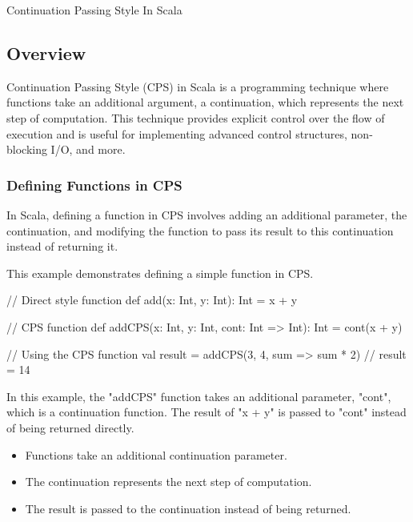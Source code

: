 \begin{notes}{Continuation Passing Style In Scala}
    \subsection*{Overview}

    Continuation Passing Style (CPS) in Scala is a programming technique where functions take an additional argument, a continuation, which represents the next step of computation. This technique 
    provides explicit control over the flow of execution and is useful for implementing advanced control structures, non-blocking I/O, and more.
    
    \subsubsection*{Defining Functions in CPS}
    
    In Scala, defining a function in CPS involves adding an additional parameter, the continuation, and modifying the function to pass its result to this continuation instead of returning it.
    
    \begin{highlight}
    
        This example demonstrates defining a simple function in CPS.
    
    \begin{code}[Scala]
    // Direct style function
    def add(x: Int, y: Int): Int = x + y
    
    // CPS function
    def addCPS(x: Int, y: Int, cont: Int => Int): Int = cont(x + y)
    
    // Using the CPS function
    val result = addCPS(3, 4, sum => sum * 2)  // result = 14
    \end{code}
    
        In this example, the "addCPS" function takes an additional parameter, "cont", which is a continuation function. The result of "x + y" is passed to "cont" instead of being returned directly.
    
        \begin{itemize}
            \item Functions take an additional continuation parameter.
            \item The continuation represents the next step of computation.
            \item The result is passed to the continuation instead of being returned.
        \end{itemize}
    

\end{highlight}
\end{notes}
